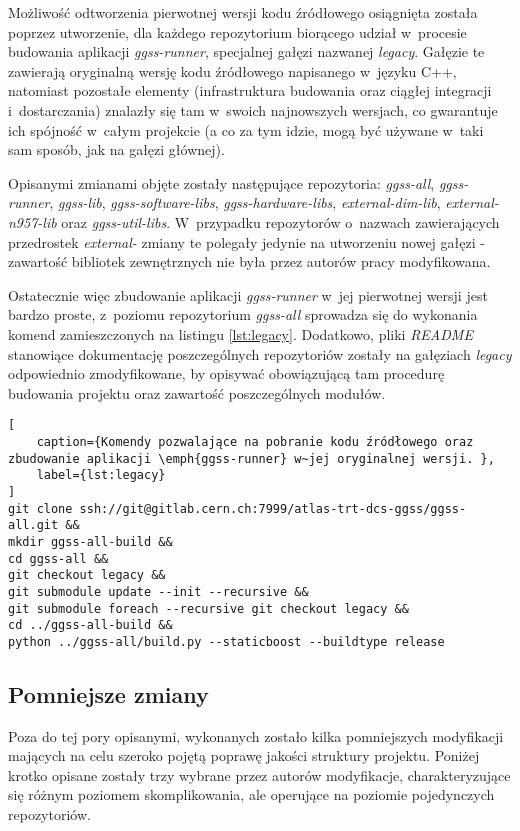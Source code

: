 Możliwość odtworzenia pierwotnej wersji kodu źródłowego osiągnięta została poprzez utworzenie, dla każdego repozytorium biorącego udział w~procesie budowania aplikacji \emph{ggss-runner}, specjalnej gałęzi nazwanej \emph{legacy}. Gałęzie te zawierają oryginalną wersję kodu źródłowego napisanego w~języku C++, natomiast pozostałe elementy (infrastruktura budowania oraz ciągłej integracji i~dostarczania) znalazły się tam w~swoich najnowszych wersjach, co gwarantuje ich spójność w~całym projekcie (a co za tym idzie, mogą być używane w~taki sam sposób, jak na gałęzi głównej).

Opisanymi zmianami objęte zostały następujące repozytoria: \emph{ggss-all}, \emph{ggss-runner}, \emph{ggss-lib}, \emph{ggss-software-libs}, \emph{ggss-hardware-libs}, \emph{external-dim-lib}, \emph{external-n957-lib} oraz \emph{ggss-util-libs}. W~przypadku repozytorów o~nazwach zawierających przedrostek \emph{external-} zmiany te polegały jedynie na utworzeniu nowej gałęzi - zawartość bibliotek zewnętrznych nie była przez autorów pracy modyfikowana.

Ostatecznie więc zbudowanie aplikacji \emph{ggss-runner} w~jej pierwotnej wersji jest bardzo proste, z~poziomu repozytorium \emph{ggss-all} sprowadza się do wykonania komend zamieszczonych na listingu \ref{lst:legacy}. Dodatkowo, pliki \emph{README} stanowiące dokumentację poszczególnych repozytoriów zostały na gałęziach \emph{legacy} odpowiednio zmodyfikowane, by opisywać obowiązującą tam procedurę budowania projektu oraz zawartość poszczególnych modułów.

\begin{lstlisting}[
    caption={Komendy pozwalające na pobranie kodu źródłowego oraz zbudowanie aplikacji \emph{ggss-runner} w~jej oryginalnej wersji. },
    label={lst:legacy}
]
git clone ssh://git@gitlab.cern.ch:7999/atlas-trt-dcs-ggss/ggss-all.git &&
mkdir ggss-all-build &&
cd ggss-all &&
git checkout legacy &&
git submodule update --init --recursive &&
git submodule foreach --recursive git checkout legacy &&
cd ../ggss-all-build &&
python ../ggss-all/build.py --staticboost --buildtype release
\end{lstlisting}

\subsection{Pomniejsze zmiany}
Poza do tej pory opisanymi, wykonanych zostało kilka pomniejszych modyfikacji mających na celu szeroko pojętą poprawę jakości struktury projektu. Poniżej krotko opisane zostały trzy wybrane przez autorów modyfikacje, charakteryzujące się różnym poziomem skomplikowania, ale operujące na poziomie pojedynczych repozytoriów. 

